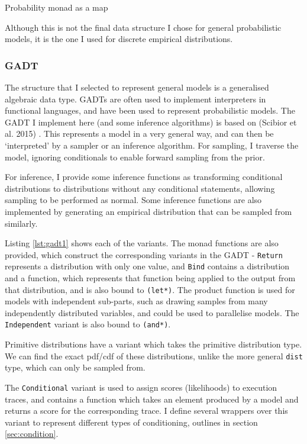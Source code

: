 \begin{listing}[!ht]
	\caption{Probability monad as a map}
	\label{lst:monad_pmap}
\end{listing}

Although this is not the final data structure I chose for general probabilistic models, it is the one I used for discrete empirical distributions.

\subsubsection{GADT} \label{sec:gadt}

The structure that I selected to represent general models is a generalised algebraic data type. GADTs are often used to implement interpreters in functional languages, and have been used to represent probabilistic models. The GADT I implement here (and some inference algorithms) is based on (Scibior et al. 2015) \cite{scibior2015practical}. This represents a model in a very general way, and can then be `interpreted' by a sampler or an inference algorithm. For sampling, I traverse the model, ignoring conditionals to enable forward sampling from the prior. 

For inference, I provide some inference functions as transforming conditional distributions to distributions without any conditional statements, allowing sampling to be performed as normal. Some inference functions are also implemented by generating an empirical distribution that can be sampled from similarly.

Listing \ref{lst:gadt1} shows each of the variants. The monad functions are also provided, which construct the corresponding variants in the GADT - \texttt{Return} represents a distribution with only one value, and \texttt{Bind} contains a distribution and a function, which represents that function being applied to the output from that distribution, and is also bound to \texttt{(let*)}. The product function is used for models with independent sub-parts, such as drawing samples from many independently distributed variables, and could be used to parallelise models. The \texttt{Independent} variant is also bound to \texttt{(and*)}.

Primitive distributions have a variant which takes the primitive distribution type. We can find the exact pdf/cdf of these distributions, unlike the more general \texttt{dist} type, which can only be sampled from.

The \texttt{Conditional} variant is used to assign scores (likelihoods) to execution traces, and contains a function which takes an element produced by a model and returns a score for the corresponding trace. I define several wrappers over this variant to represent different types of conditioning, outlines in section \ref{sec:condition}.

